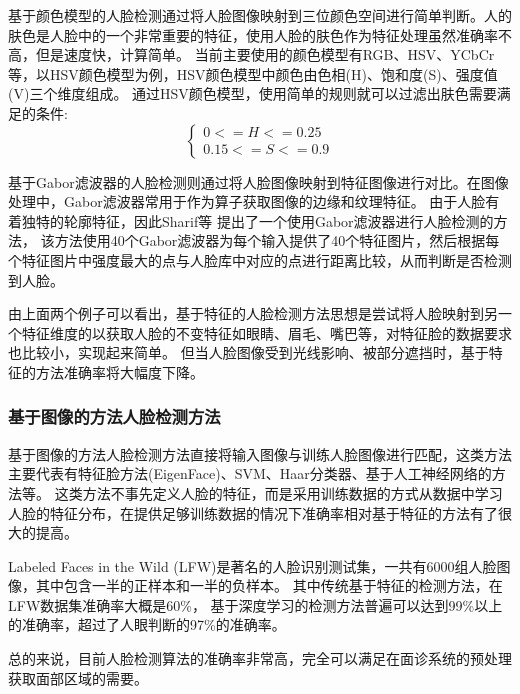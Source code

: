 基于颜色模型的人脸检测通过将人脸图像映射到三位颜色空间进行简单判断。人的肤色是人脸中的一个非常重要的特征，使用人脸的肤色作为特征处理虽然准确率不高，但是速度快，计算简单。
当前主要使用的颜色模型有RGB、HSV、YCbCr等，以HSV颜色模型为例，HSV颜色模型中颜色由色相(H)、饱和度(S)、强度值(V)三个维度组成。
通过HSV颜色模型，使用简单的规则就可以过滤出肤色需要满足的条件:
$$
\left\{ 
\begin{array}{c}
    0 <= H <= 0.25 \\ 
    0.15 <= S <= 0.9
\end{array}
\right. 
$$

基于Gabor滤波器的人脸检测则通过将人脸图像映射到特征图像进行对比。在图像处理中，Gabor滤波器常用于作为算子获取图像的边缘和纹理特征\cite{sahib2020hybrid}。
由于人脸有着独特的轮廓特征，因此Sharif等 \cite{sharif2011face}提出了一个使用Gabor滤波器进行人脸检测的方法，
该方法使用40个Gabor滤波器为每个输入提供了40个特征图片，然后根据每个特征图片中强度最大的点与人脸库中对应的点进行距离比较，从而判断是否检测到人脸。

由上面两个例子可以看出，基于特征的人脸检测方法思想是尝试将人脸映射到另一个特征维度的以获取人脸的不变特征如眼睛、眉毛、嘴巴等，对特征脸的数据要求也比较小，实现起来简单。
但当人脸图像受到光线影响、被部分遮挡时，基于特征的方法准确率将大幅度下降。

\subsubsection{基于图像的方法人脸检测方法}
基于图像的方法人脸检测方法直接将输入图像与训练人脸图像进行匹配，这类方法主要代表有特征脸方法(EigenFace)、SVM、Haar分类器、基于人工神经网络\cite{farfade2015multi}的方法等。
这类方法不事先定义人脸的特征，而是采用训练数据的方式从数据中学习人脸的特征分布，在提供足够训练数据的情况下准确率相对基于特征的方法有了很大的提高。

Labeled Faces in the Wild (LFW)是著名的人脸识别测试集，一共有6000组人脸图像，其中包含一半的正样本和一半的负样本。
其中传统基于特征的检测方法，在LFW数据集准确率大概是60\%， 基于深度学习的检测方法普遍可以达到99\%以上的准确率，超过了人眼判断的97\%的准确率\cite{sun2015deeply}。

总的来说，目前人脸检测算法的准确率非常高，完全可以满足在面诊系统的预处理获取面部区域的需要。

